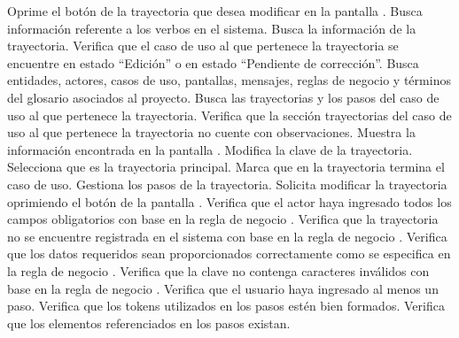  \begin{UCtrayectoria}
	\UCpaso[\UCactor] Oprime el botón \btnEditar de la trayectoria que desea modificar en la pantalla . 
	\UCpaso[\UCsist] Busca información referente a los verbos en el sistema. 
	\UCpaso[\UCsist] Busca la información de la trayectoria.	
	\UCpaso[\UCsist] Verifica que el caso de uso al que pertenece la trayectoria se encuentre en estado ``Edición'' o en estado ``Pendiente de corrección''.
	\UCpaso[\UCsist] Busca entidades, actores, casos de uso, pantallas, mensajes, reglas de negocio y términos del glosario asociados al proyecto.
	\UCpaso[\UCsist] Busca las trayectorias y los pasos del caso de uso al que pertenece la trayectoria.
	\UCpaso[\UCsist] Verifica que la sección trayectorias del caso de uso al que pertenece la trayectoria no cuente con observaciones. 
	\UCpaso[\UCsist] Muestra la información encontrada en la pantalla . \label{cu5.1.1.2:muestra}
	\UCpaso[\UCactor] Modifica la clave de la trayectoria.
	\UCpaso[\UCactor] Selecciona que es la trayectoria principal.  \label{cu5.1.1.2:ingresaDatos}
	\UCpaso[\UCsist] Marca que en la trayectoria termina el caso de uso.
	\UCpaso[\UCactor] Gestiona los pasos de la trayectoria. \label{cu5.1.1.2:gestionaPasos}
	\UCpaso[\UCactor] Solicita modificar la trayectoria oprimiendo el botón  de la pantalla .  
	\UCpaso[\UCsist] Verifica que el actor haya ingresado todos los campos obligatorios con base en la regla de negocio . 
	\UCpaso[\UCsist] Verifica que la trayectoria no se encuentre registrada en el sistema con base en la regla de negocio . 
	\UCpaso[\UCsist] Verifica que los datos requeridos sean proporcionados correctamente como se especifica en la regla de negocio .  
	\UCpaso[\UCsist] Verifica que la clave no contenga caracteres inválidos con base en la regla de negocio . 
	\UCpaso[\UCsist] Verifica que el usuario haya ingresado al menos un paso. 
	\UCpaso[\UCsist] Verifica que los tokens utilizados en los pasos estén bien formados. 
	\UCpaso[\UCsist] Verifica que los elementos referenciados en los pasos existan. 


\end{UCtrayectoria}
